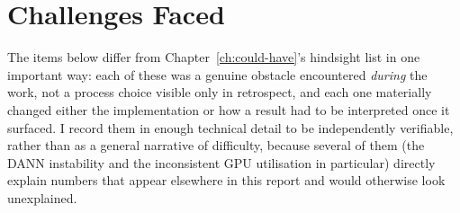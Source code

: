 \documentclass[11pt]{report}
\begin{document}
\chapter{Challenges Faced}
\label{ch:challenges}

The items below differ from Chapter~\ref{ch:could-have}'s hindsight list in
one important way: each of these was a genuine obstacle encountered
\emph{during} the work, not a process choice visible only in retrospect, and
each one materially changed either the implementation or how a result had to
be interpreted once it surfaced. I record them in enough technical detail to
be independently verifiable, rather than as a general narrative of
difficulty, because several of them (the DANN instability and the
inconsistent GPU utilisation in particular) directly explain numbers that
appear elsewhere in this report and would otherwise look unexplained.
\end{document}
